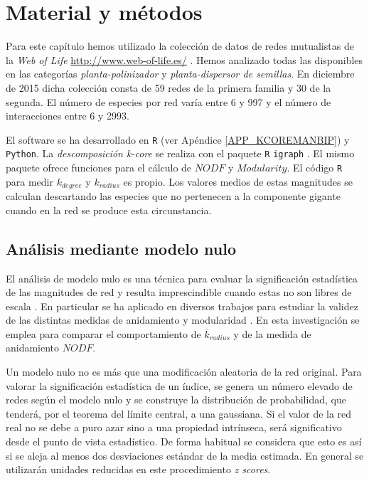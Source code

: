 \section{Material y métodos}

Para este capítulo hemos utilizado la colección de datos de redes mutualistas de la \textit{Web of Life}  \url{http://www.web-of-life.es/} \cite{fortuna2014web}. Hemos analizado todas las disponibles en las categorías \textit{planta-polinizador} y \textit{planta-dispersor de semillas}. En diciembre de 2015 dicha colección consta de 59 redes de la primera familia y 30 de la segunda. El número de especies por red varía entre 6 y 997 y el número de interacciones entre 6 y 2993.

El software se ha desarrollado en \texttt{R} (ver Apéndice \ref{APP_KCOREMANBIP}) y \texttt{Python}. La \textit{descomposición k-core} se realiza con el paquete \texttt{R} \texttt{igraph} \cite{csardi2006igraph}. El mismo paquete ofrece funciones para el cálculo de $NODF$ y $Modularity$. El código \texttt{R} para medir ${k}_{degree}$ y ${k}_{radius}$ es propio. Los valores medios de estas magnitudes se calculan descartando las especies que no pertenecen a la componente gigante cuando en la red se produce esta circunstancia. 

\subsection{Análisis mediante modelo nulo}
\label{sec:nullmodels}

El análisis de modelo nulo es una técnica para evaluar la significación estadística de las magnitudes de red y resulta imprescindible cuando estas no son libres de escala \cite{gotelli1996null}. En particular se ha aplicado en diversos trabajos para estudiar la validez de las distintas medidas de anidamiento \cite{ulrich2013pattern, feng2014heterogeneity} y modularidad \cite{fortuna2010nestedness, mello2011modularity}. En esta investigación se emplea para comparar el comportamiento de $\overline k_{radius}$ y de la medida de anidamiento $NODF$.

Un modelo nulo no es más que una modificación aleatoria de la red original. Para valorar la significación estadística de un índice, se genera un
número elevado de redes según el modelo nulo y se construye la distribución de probabilidad, que tenderá, por el teorema del límite central, a una gaussiana. Si el valor de la red real no se debe a puro azar sino a una propiedad intrínseca, será significativo desde el punto de vista estadístico. De forma habitual se considera que esto es así
si se aleja al menos dos desviaciones estándar de la media estimada. En general se utilizarán unidades reducidas en este procedimiento \textit{z scores}.

